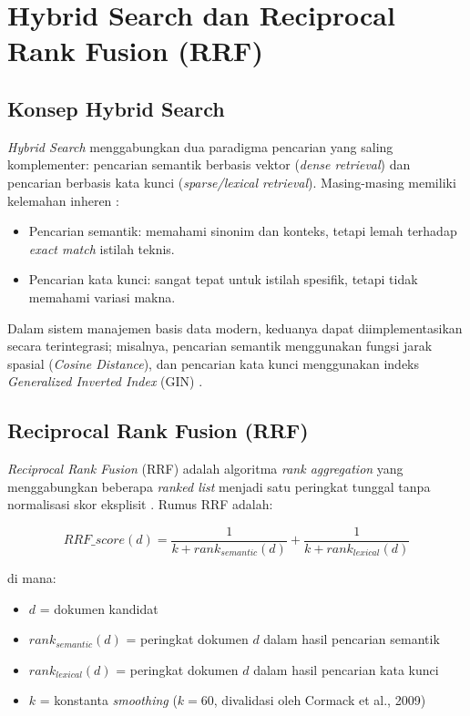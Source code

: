 \section{Hybrid Search dan Reciprocal Rank Fusion (RRF)}
\subsection{Konsep Hybrid Search}
\textit{Hybrid Search} menggabungkan dua paradigma pencarian yang saling komplementer:
pencarian semantik berbasis vektor (\textit{dense retrieval}) dan pencarian berbasis
kata kunci (\textit{sparse/lexical retrieval}). Masing-masing memiliki kelemahan
inheren \cite{Luan2021}:

\begin{itemize}
  \item Pencarian semantik: memahami sinonim dan konteks, tetapi lemah terhadap \textit{exact match} istilah teknis.
  \item Pencarian kata kunci: sangat tepat untuk istilah spesifik, tetapi tidak memahami variasi makna.
\end{itemize}

Dalam sistem manajemen basis data modern, keduanya dapat diimplementasikan secara terintegrasi;
misalnya, pencarian semantik menggunakan fungsi jarak spasial (\textit{Cosine Distance}),
dan pencarian kata kunci menggunakan indeks \textit{Generalized Inverted Index} (GIN) \cite{Wang2021}.

\subsection{Reciprocal Rank Fusion (RRF)}
\textit{Reciprocal Rank Fusion} (RRF) adalah algoritma \textit{rank aggregation} yang
menggabungkan beberapa \textit{ranked list} menjadi satu peringkat tunggal tanpa
normalisasi skor eksplisit \cite{Cormack2009}. Rumus RRF adalah:

\begin{equation}
  RRF\_score(d) = \frac{1}{k + rank_{semantic}(d)} + \frac{1}{k + rank_{lexical}(d)}
  \label{eq:rrf}
\end{equation}

\noindent di mana:
\begin{itemize}[noitemsep]
  \item $d$ = dokumen kandidat
  \item $rank_{semantic}(d)$ = peringkat dokumen $d$ dalam hasil pencarian semantik
  \item $rank_{lexical}(d)$ = peringkat dokumen $d$ dalam hasil pencarian kata kunci
  \item $k$ = konstanta \textit{smoothing} ($k = 60$, divalidasi oleh Cormack et al., 2009)
\end{itemize}

